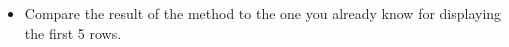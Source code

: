 \documentclass[letterpaper,10pt,english]{sphinxmanual}
\begin{document}
\begin{itemize}
\item {} 
Compare the result of the  method to the one you already know for displaying the first 5 rows.

\end{itemize}

{
\begin{sphinxVerbatim}[commandchars=\\\{\}]
\llap{\color{nbsphinxin}[27]:\,\hspace{\fboxrule}\hspace{\fboxsep}}
\end{sphinxVerbatim}
}
\end{document}
